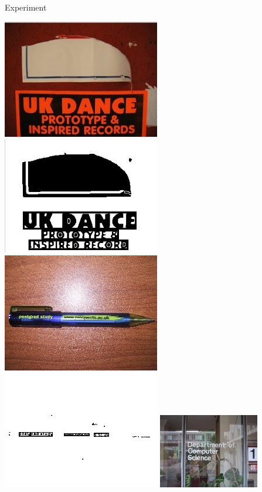 \documentclass[a0paper,portrait]{baposter}
\begin{document}
\begin{poster}
\begin{posterbox}[name=experiment,column=2,below = example]{Experiment}
\begin{center}
  \includegraphics[width=1\headerheight]{ex11.jpg}
  \includegraphics[width=1\headerheight]{ex12.jpg}
  \vspace{0.15cm}
  \hfill
  \includegraphics[width=1\headerheight]{ex21.jpg}
  \includegraphics[width=1\headerheight]{ex22.jpg}
  \vspace{0.15cm}
  \hfill
  \includegraphics[width=1\headerheight]{ex31.jpg}

\end{center}
\end{posterbox}
\end{poster}
\end{document}
